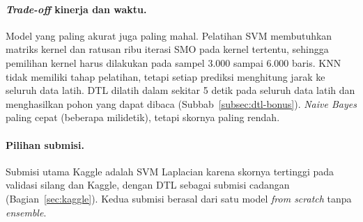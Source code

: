 \paragraph{\textit{Trade-off} kinerja dan waktu.} Model yang paling akurat juga paling mahal. Pelatihan
SVM membutuhkan matriks kernel dan ratusan ribu iterasi SMO pada kernel tertentu, sehingga pemilihan
kernel harus dilakukan pada sampel 3.000 sampai 6.000 baris. KNN tidak memiliki tahap pelatihan,
tetapi setiap prediksi menghitung jarak ke seluruh data latih. DTL dilatih dalam sekitar 5 detik pada
seluruh data latih dan menghasilkan pohon yang dapat dibaca (Subbab~\ref{subsec:dtl-bonus}).
\textit{Naive Bayes} paling cepat (beberapa milidetik), tetapi skornya paling rendah.

\paragraph{Pilihan submisi.} Submisi utama Kaggle adalah SVM Laplacian karena skornya tertinggi pada
validasi silang dan Kaggle, dengan DTL sebagai submisi cadangan (Bagian~\ref{sec:kaggle}). Kedua
submisi berasal dari satu model \textit{from scratch} tanpa \textit{ensemble}.
